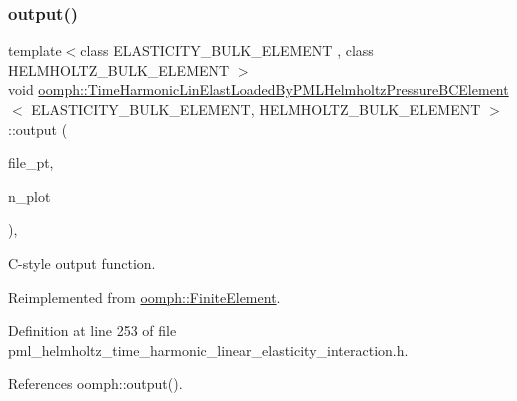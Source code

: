 \subsubsection{\texorpdfstring{output()}{output()}\hspace{0.1cm}{\footnotesize\ttfamily [4/4]}}
{\footnotesize\ttfamily template$<$class E\+L\+A\+S\+T\+I\+C\+I\+T\+Y\+\_\+\+B\+U\+L\+K\+\_\+\+E\+L\+E\+M\+E\+NT , class H\+E\+L\+M\+H\+O\+L\+T\+Z\+\_\+\+B\+U\+L\+K\+\_\+\+E\+L\+E\+M\+E\+NT $>$ \\
void \hyperlink{classoomph_1_1TimeHarmonicLinElastLoadedByPMLHelmholtzPressureBCElement}{oomph\+::\+Time\+Harmonic\+Lin\+Elast\+Loaded\+By\+P\+M\+L\+Helmholtz\+Pressure\+B\+C\+Element}$<$ E\+L\+A\+S\+T\+I\+C\+I\+T\+Y\+\_\+\+B\+U\+L\+K\+\_\+\+E\+L\+E\+M\+E\+NT, H\+E\+L\+M\+H\+O\+L\+T\+Z\+\_\+\+B\+U\+L\+K\+\_\+\+E\+L\+E\+M\+E\+NT $>$\+::output (\begin{DoxyParamCaption}\item[{F\+I\+LE $\ast$}]{file\+\_\+pt,  }\item[{const unsigned \&}]{n\+\_\+plot }\end{DoxyParamCaption})\hspace{0.3cm}{\ttfamily [inline]}, {\ttfamily [virtual]}}



C-\/style output function. 



Reimplemented from \hyperlink{classoomph_1_1FiniteElement_adfaee690bb0608f03320eeb9d110d48c}{oomph\+::\+Finite\+Element}.



Definition at line 253 of file pml\+\_\+helmholtz\+\_\+time\+\_\+harmonic\+\_\+linear\+\_\+elasticity\+\_\+interaction.\+h.



References oomph\+::output().

\mbox{\label{classoomph_1_1TimeHarmonicLinElastLoadedByPMLHelmholtzPressureBCElement_a9a010f4abd0ef1d311841b1a80b89495}} 
